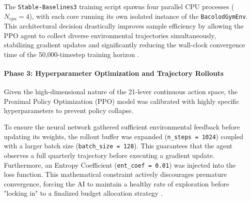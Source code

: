 The \texttt{Stable-Baselines3} training script spawns four parallel CPU processes ($N_{cpu} = 4$), with each core running its own isolated instance of the \texttt{BacolodGymEnv}. This architectural decision drastically improves sample efficiency by allowing the PPO agent to collect diverse environmental trajectories simultaneously, stabilizing gradient updates and significantly reducing the wall-clock convergence time of the 50,000-timestep training horizon \citep{Jimenez2025}.

\paragraph{Phase 3: Hyperparameter Optimization and Trajectory Rollouts}
Given the high-dimensional nature of the 21-lever continuous action space, the Proximal Policy Optimization (PPO) model was calibrated with highly specific hyperparameters to prevent policy collapse. 

To ensure the neural network gathered sufficient environmental feedback before updating its weights, the rollout buffer was expanded (\texttt{n\_steps = 1024}) coupled with a larger batch size (\texttt{batch\_size = 128}). This guarantees that the agent observes a full quarterly trajectory before executing a gradient update. Furthermore, an Entropy Coefficient (\texttt{ent\_coef = 0.01}) was injected into the loss function. This mathematical constraint actively discourages premature convergence, forcing the AI to maintain a healthy rate of exploration before "locking in" to a finalized budget allocation strategy \citep{Raffin2021}.

